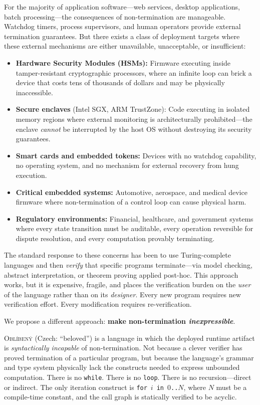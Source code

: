 \documentclass[11pt,a4paper]{article}
\newcommand{\obl}{\textsc{Obl\'{i}ben\'{y}}}
\begin{document}
For the majority of application software---web services, desktop applications,
batch processing---the consequences of non-termination are manageable.
Watchdog timers, process supervisors, and human operators provide external
termination guarantees.  But there exists a class of deployment targets where
these external mechanisms are either unavailable, unacceptable, or
insufficient:

\begin{itemize}[nosep]
  \item \textbf{Hardware Security Modules (HSMs):}  Firmware executing inside
    tamper-resistant cryptographic processors, where an infinite loop can brick
    a device that costs tens of thousands of dollars and may be physically
    inaccessible.
  \item \textbf{Secure enclaves} (Intel SGX, ARM TrustZone):  Code executing
    in isolated memory regions where external monitoring is architecturally
    prohibited---the enclave \emph{cannot} be interrupted by the host OS
    without destroying its security guarantees.
  \item \textbf{Smart cards and embedded tokens:}  Devices with no watchdog
    capability, no operating system, and no mechanism for external recovery
    from hung execution.
  \item \textbf{Critical embedded systems:}  Automotive, aerospace, and
    medical device firmware where non-termination of a control loop can cause
    physical harm.
  \item \textbf{Regulatory environments:}  Financial, healthcare, and
    government systems where every state transition must be auditable, every
    operation reversible for dispute resolution, and every computation
    provably terminating.
\end{itemize}

The standard response to these concerns has been to use Turing-complete
languages and then \emph{verify} that specific programs terminate---via model
checking, abstract interpretation, or theorem proving applied post-hoc.  This
approach works, but it is expensive, fragile, and places the verification
burden on the \emph{user} of the language rather than on its \emph{designer}.
Every new program requires new verification effort.  Every modification
requires re-verification.

We propose a different approach: \textbf{make non-termination
\emph{inexpressible}}.

\obl{} (Czech: ``beloved'') is a language in which the deployed runtime
artifact is \emph{syntactically incapable} of non-termination.  Not because a
clever verifier has proved termination of a particular program, but because
the language's grammar and type system physically lack the constructs needed
to express unbounded computation.  There is no \texttt{while}.  There is no
\texttt{loop}.  There is no recursion---direct or indirect.  The only
iteration construct is \texttt{for}~$i$~\texttt{in}~$0$\texttt{..}$N$, where
$N$ must be a compile-time constant, and the call graph is statically verified
to be acyclic.
\end{document}
